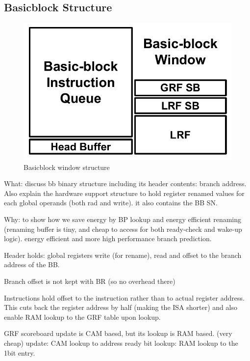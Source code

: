 \subsection{Basicblock Structure}
\label{sec:bb_struct}

\begin{figure}
	\centering
	\includegraphics[width=1.0\columnwidth]{fig/bb_window.pdf} 
	\caption{Basicblock window structure}
	\label{fig:bb_window}
\end{figure}

What: discuss bb binary structure including its header contents: branch address.
Also explain the hardware support structure to hold register renamed values for
each global operands (both rad and write). it also contains the BB SN.

Why: to show how we save energy by BP lookup and energy efficient renaming
(renaming buffer is tiny, and cheap to access for both ready-check and wake-up
 logic). energy efficient and more high performance branch prediction.

Header holds: global registers write (for rename), read and offset to the branch
address of the BB.

Branch offset is not kept with BR (so no overhead there)

Instructions hold offset to the instruction rather than to actual register
address. This cuts back the register address by half (making the ISA shorter)
    and also enable RAM lookup to the GRF table upon lookup.

GRF scoreboard update is CAM baesd, but its lookup is RAM based. (very cheap)
    update: CAM lookup to address ready bit
    lookup: RAM lookup to the 1bit entry.

